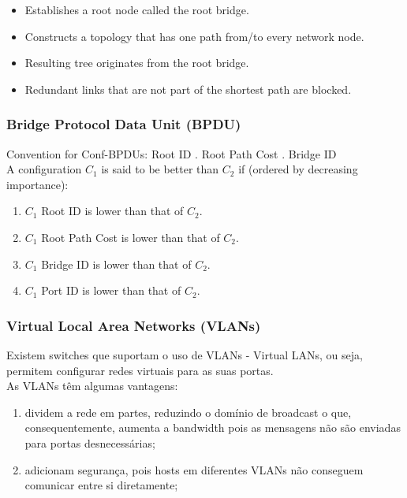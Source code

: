 \documentclass[12pt]{article}
\begin{document}
\begin{itemize}
    \item Establishes a root node called the root bridge.
    \item Constructs a topology that has one path from/to every network node.
    \item Resulting tree originates from the root bridge.
    \item Redundant links that are not part of the shortest path are blocked.
\end{itemize}

\subsubsection*{Bridge Protocol Data Unit (BPDU)}

Convention for Conf-BPDUs: Root ID . Root Path Cost . Bridge ID \\\newline
A configuration $C_1$ is said to be better than $C_2$ if (ordered by decreasing importance):

\begin{enumerate}[topsep=0pt, itemsep=0pt]
    \item $C_1$ Root ID is lower than that of $C_2$.
    \item $C_1$ Root Path Cost is lower than that of $C_2$.
    \item $C_1$ Bridge ID is lower than that of $C_2$.
    \item $C_1$ Port ID is lower than that of $C_2$.
\end{enumerate}

\subsubsection{Virtual Local Area Networks (VLANs)}

Existem switches que suportam o uso de VLANs - Virtual LANs, ou seja, permitem configurar redes virtuais para as suas portas.\\

As VLANs têm algumas vantagens:

\begin{enumerate}
    \item dividem a rede em partes, reduzindo o domínio de broadcast o que, consequentemente, aumenta a bandwidth pois as mensagens não são enviadas para portas desnecessárias;
    \item adicionam segurança, pois hosts em diferentes VLANs não conseguem comunicar entre si diretamente;
\end{enumerate}
\end{document}
